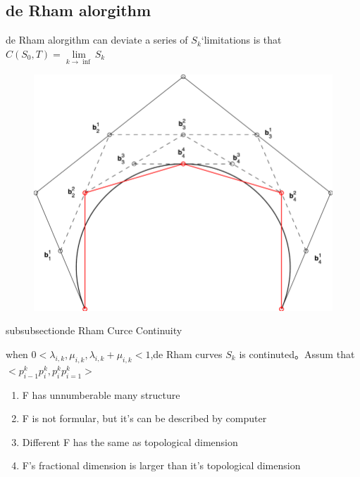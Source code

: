 \newpage


\subsection{de Rham alorgithm}
de Rham alorgithm can deviate a series of $S_k$‘limitations is that $C(S_0,T) = \lim\limits_{k\rightarrow \inf}S_k$


\begin{figure}
	\begin{center}
		\includegraphics[scale=1]{img/1.png}
	\end{center}
	\caption{}\label{fig:}
\end{figure}

subsubsection{de Rham Curce Continuity}

\begin{property}[Continuity]
	when $0<\lambda _{i,k},\mu_{i,k},\lambda_{i,k}+\mu_{i,k}<1$,de Rham curves $S_k$ is continuted。Assum that $<p_{i-1}^{k}p_{i}^{k},p_{i}^{k}p_{i=1}^{k}>$
\end{property}

\begin{property}
	\begin{enumerate}
		\item F has unnumberable many structure
		\item F is not formular, but it's can be described by computer
		\item Different F has the same as topological dimension
		\item F's fractional dimension is larger than it's topological dimension
	\end{enumerate}
\end{property}
